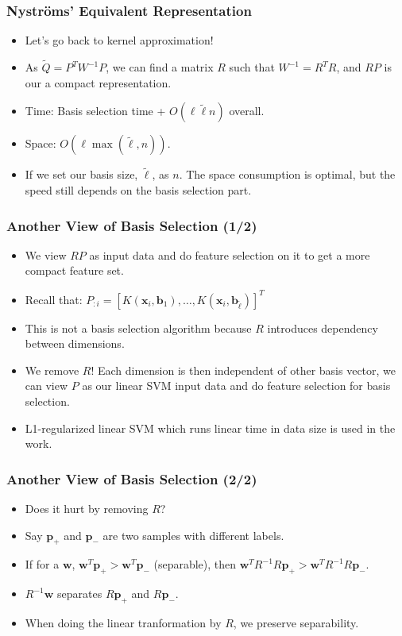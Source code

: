 \documentclass{beamer}
\def\bb{{\boldsymbol b}}
\def\bw{{\boldsymbol w}}
\def\bb{{\boldsymbol b}}
\def\bp{{\boldsymbol p}}
\def\bx{{\boldsymbol x}}
\begin{document}
\begin{frame}
  \frametitle{Nystr\"oms' Equivalent Representation}
  \begin{itemize}
    \item Let's go back to kernel approximation!
    \pause
    \item As $\tilde{Q} = P^TW^{-1}P$, we can find a matrix $R$ such that $W^{-1} = R^TR$, and $RP$ is our a compact representation.
    \pause
    \item [] Time: Basis selection time + $O(\ell \tilde{\ell} n)$ overall.
    \item [] Space: $O(\ell \max(\tilde{\ell}, n))$.
    \pause
    \item If we set our basis size, $\tilde{\ell}$, as $n$. The space consumption is optimal, but the speed still depends on the basis selection part.
  \end{itemize}
\end{frame}

\begin{frame}
  \frametitle{Another View of Basis Selection (1/2)}
  \begin{itemize}
    \item We view $RP$ as input data and do feature selection on it to get a more compact feature set.
    \item Recall that: $P_{:i} = [K(\bx_i, \bb_1), \dots, K(\bx_i, \bb_{\tilde{\ell}})]^T$
    \item This is not a basis selection algorithm because $R$ introduces dependency between dimensions.
    \pause
    \item We remove $R$! Each dimension is then independent of other basis vector, we can view $P$ as our linear SVM input data and do feature selection for basis selection. 
    \item L1-regularized linear SVM which runs linear time in data size is used in the work.
  \end{itemize}
\end{frame}

\begin{frame}
  \frametitle{Another View of Basis Selection (2/2)}
  \begin{itemize}
    \item Does it hurt by removing $R$?
    \pause
    \item Say $\bp_+$ and $\bp_-$ are two samples with different labels.
    \pause
    \item If for a $\bw$, $\bw^T\bp_+ > \bw^T\bp_-$ (separable), then
    $\bw^TR^{-1}R\bp_+  > \bw^TR^{-1}R\bp_-$.
    \pause
    \item $R^{-1}\bw$ separates $R\bp_+$ and $R\bp_-$.
    \pause
    \item When doing the linear tranformation by $R$, we preserve separability.
  \end{itemize}
\end{frame}
\end{document}
